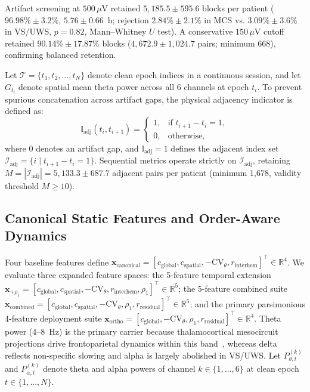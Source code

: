\documentclass[journal,twoside,web]{ieeecolor}
\begin{document}
Artifact screening at $500\,\mu\mathrm{V}$ retained $5{,}185.5 \pm 595.6$ blocks per patient ($96.98\% \pm 3.2\%$, $5.76 \pm 0.66$~h; rejection $2.84\% \pm 2.1\%$ in MCS vs. $3.09\% \pm 3.6\%$ in VS/UWS, $p=0.82$, Mann--Whitney $U$ test). A conservative $150\,\mu\mathrm{V}$ cutoff retained $90.14\% \pm 17.87\%$ blocks ($4{,}672.9 \pm 1{,}024.7$ pairs; minimum 668), confirming balanced retention.

Let $\mathcal{T} = \{t_1, t_2, \dots, t_N\}$ denote clean epoch indices in a continuous session, and let $G_{t_i}$ denote spatial mean theta power across all 6 channels at epoch $t_i$. To prevent spurious concatenation across artifact gaps, the physical adjacency indicator is defined as:
\begin{equation}
\mathbb{I}_{\text{adj}}(t_i, t_{i+1}) = 
\begin{cases}
1, & \text{if } t_{i+1} - t_i = 1, \\
0, & \text{otherwise},
\end{cases}
\end{equation}
where 0 denotes an artifact gap, and $\mathbb{I}_{\text{adj}} = 1$ defines the adjacent index set $\mathcal{I}_{\text{adj}} = \{i \mid t_{i+1}-t_i=1\}$. Sequential metrics operate strictly on $\mathcal{I}_{\text{adj}}$, retaining $M = |\mathcal{I}_{\text{adj}}| = 5{,}133.3 \pm 687.7$ adjacent pairs per patient (minimum 1,678, validity threshold $M \ge 10$).
\subsection{Canonical Static Features and Order-Aware Dynamics}
Four baseline features define $\mathbf{x}_{\text{canonical}} = [c_{\text{global}}, \allowbreak c_{\text{spatial}}, \allowbreak -\mathrm{CV}_\theta, \allowbreak r_{\text{interhem}}]^\top \allowbreak \in \mathbb{R}^4$. We evaluate three expanded feature spaces: the 5-feature temporal extension $\mathbf{x}_{+\rho_1} = [c_{\text{global}}, c_{\text{spatial}}, -\mathrm{CV}_\theta, r_{\text{interhem}}, \rho_1]^\top \in \mathbb{R}^5$; the 5-feature combined suite $\mathbf{x}_{\text{combined}} = [c_{\text{global}}, c_{\text{spatial}}, -\mathrm{CV}_\theta, \rho_1, r_{\text{residual}}]^\top \in \mathbb{R}^5$; and the primary parsimonious 4-feature deployment suite $\mathbf{x}_{\text{ortho}} = [c_{\text{global}}, -\mathrm{CV}_\theta, \rho_1, r_{\text{residual}}]^\top \in \mathbb{R}^4$. Theta power (4--8~Hz) is the primary carrier because thalamocortical mesocircuit projections drive frontoparietal dynamics within this band~\cite{schiff2010recovery}, whereas delta reflects non-specific slowing and alpha is largely abolished in VS/UWS. Let $P_{\theta, t}^{(k)}$ and $P_{\alpha, t}^{(k)}$ denote theta and alpha powers of channel $k \in \{1, \dots, 6\}$ at clean epoch $t \in \{1, \dots, N\}$.
\end{document}
